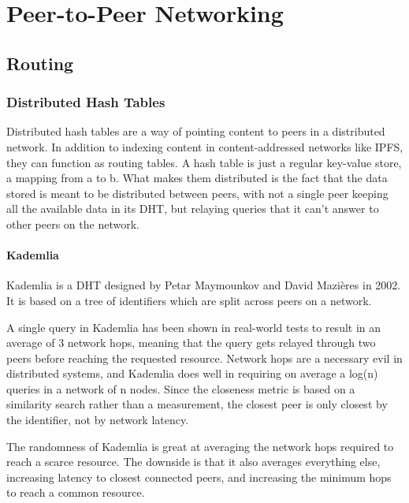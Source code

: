 \chapter{Peer-to-Peer Networking}
\label{Peer-to-Peer Networking}
						
\section{Routing}
						
						
\subsection{Distributed Hash Tables}
Distributed hash tables are a way of pointing content to peers in a distributed network. In addition to indexing content in content-addressed networks like IPFS, they can function as routing tables. A hash table is just a regular key-value store, a mapping from a to b. What makes them distributed is the fact that the data stored is meant to be distributed between peers, with not a single peer keeping all the available data in its DHT, but relaying queries that it can't answer to other peers on the network.
						
\subsubsection{Kademlia}
Kademlia is a DHT designed by Petar Maymounkov and David Mazières in 2002. It is based on a tree of identifiers which are split across peers on a network.
						
A single query in Kademlia has been shown in real-world tests to result in an average of 3 network hops, meaning that the query gets relayed through two peers before reaching the requested resource.\cite{Roos2013-mb} Network hops are a necessary evil in distributed systems, and Kademlia does well in requiring on average a log(n) queries in a network of n nodes. Since the closeness metric is based on a similarity search rather than a measurement, the closest peer is only closest by the identifier, not by network latency.\cite{Eigenmann2020-zm}
						
The randomness of Kademlia is great at averaging the network hops required to reach a scarce resource. The downside is that it also averages everything else, increasing latency to closest connected peers, and increasing the minimum hops to reach a common resource.
